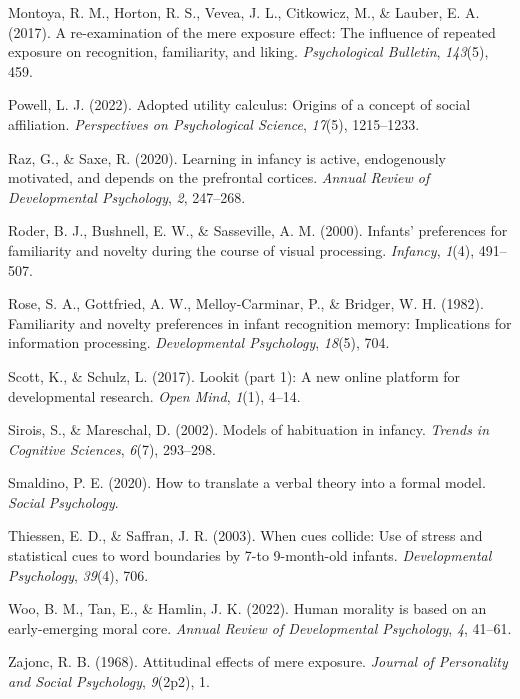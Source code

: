 \documentclass[10pt, letterpaper]{article}
\newenvironment{CSLReferences}%
  {}%
  {\par}
\begin{document}
\begin{CSLReferences}{1}{0}
\leavevmode{}%
Montoya, R. M., Horton, R. S., Vevea, J. L., Citkowicz, M., \& Lauber,
E. A. (2017). A re-examination of the mere exposure effect: The
influence of repeated exposure on recognition, familiarity, and liking.
\emph{Psychological Bulletin}, \emph{143}(5), 459.

\leavevmode{}%
Powell, L. J. (2022). Adopted utility calculus: Origins of a concept of
social affiliation. \emph{Perspectives on Psychological Science},
\emph{17}(5), 1215--1233.

\leavevmode{}%
Raz, G., \& Saxe, R. (2020). Learning in infancy is active, endogenously
motivated, and depends on the prefrontal cortices. \emph{Annual Review
of Developmental Psychology}, \emph{2}, 247--268.

\leavevmode{}%
Roder, B. J., Bushnell, E. W., \& Sasseville, A. M. (2000). Infants'
preferences for familiarity and novelty during the course of visual
processing. \emph{Infancy}, \emph{1}(4), 491--507.

\leavevmode{}%
Rose, S. A., Gottfried, A. W., Melloy-Carminar, P., \& Bridger, W. H.
(1982). Familiarity and novelty preferences in infant recognition
memory: Implications for information processing. \emph{Developmental
Psychology}, \emph{18}(5), 704.

\leavevmode{}%
Scott, K., \& Schulz, L. (2017). Lookit (part 1): A new online platform
for developmental research. \emph{Open Mind}, \emph{1}(1), 4--14.

\leavevmode{}%
Sirois, S., \& Mareschal, D. (2002). Models of habituation in infancy.
\emph{Trends in Cognitive Sciences}, \emph{6}(7), 293--298.

\leavevmode{}%
Smaldino, P. E. (2020). How to translate a verbal theory into a formal
model. \emph{Social Psychology}.

\leavevmode{}%
Thiessen, E. D., \& Saffran, J. R. (2003). When cues collide: Use of
stress and statistical cues to word boundaries by 7-to 9-month-old
infants. \emph{Developmental Psychology}, \emph{39}(4), 706.

\leavevmode{}%
Woo, B. M., Tan, E., \& Hamlin, J. K. (2022). Human morality is based on
an early-emerging moral core. \emph{Annual Review of Developmental
Psychology}, \emph{4}, 41--61.

\leavevmode{}%
Zajonc, R. B. (1968). Attitudinal effects of mere exposure.
\emph{Journal of Personality and Social Psychology}, \emph{9}(2p2), 1.

\end{CSLReferences}


\end{document}
